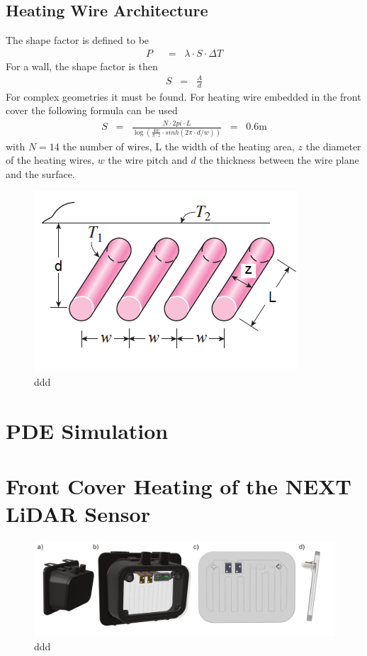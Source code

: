 \subsection{Heating Wire Architecture}
The shape factor is defined to be \cite{Hahne1975}
\begin{align}
P \;\; &= \;\; \lambda \cdot S \cdot \Delta T
\end{align}
For a wall, the shape factor is then
\begin{align}
S \;\; = \;\; \frac{A}{d}
\end{align}
For complex geometries it must be found. For heating wire embedded in the front cover the following formula can be used
\begin{align}
S \;\; = \;\; \frac{N\cdot 2pi\cdot L}{\log\left(\frac{4w}{\pi\cdot z}\cdot sinh(2\pi \cdot d/w)\right)} \;\; = \;\; 0.6 \mathrm{m}
\end{align}
with \(N = 14\) the number of wires, L the width of the heating area, \(z\) the diameter of the heating wires, \(w\) the wire pitch and \(d\) the thickness between the wire plane and the surface.
\begin{figure} [H]
	\centering
	\includegraphics[scale=0.8]{Pictures/TheoryShapeFactorMakrolon.png}
	\caption[NEXT LiDAR Sensor Model]{ddd}
	\label{fig:ShapeFactorMakrolon}
\end{figure}
\section{PDE Simulation}
\section{Front Cover Heating of the NEXT LiDAR Sensor}

\begin{figure} [H]
	\centering
	\includegraphics[scale=0.8]{Pictures/1TB1_3DModel.png}
	\caption[NEXT LiDAR Sensor Model]{ddd}
	\label{fig:1TB1Model}
\end{figure}


